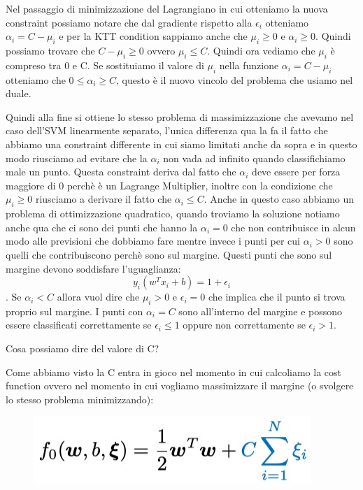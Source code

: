 \documentclass[14pt]{extreport}
\begin{document}
Nel passaggio di minimizzazione del Lagrangiano in cui otteniamo la nuova constraint possiamo notare che dal gradiente rispetto alla $\epsilon_i$
otteniamo $\alpha_i = C - \mu_i$ e per la KTT condition sappiamo anche che $\mu_i \geq 0$ e $\alpha_i \geq 0$. Quindi possiamo trovare che $C-\mu_i
\geq 0 $ ovvero $\mu_i \leq C$. Quindi ora vediamo che $\mu_i$ è compreso tra 0 e C. Se sostituiamo il valore di $\mu_i$ nella funzione $\alpha_i = C
- \mu_i$ otteniamo che $0 \leq \alpha_i \geq C$, questo è il nuovo vincolo del problema che usiamo nel duale.


Quindi alla fine si ottiene lo stesso problema di massimizzazione che avevamo nel caso dell'SVM linearmente separato, l'unica differenza qua la fa il
fatto che abbiamo una constraint differente in cui siamo limitati anche da sopra e in questo modo riusciamo ad evitare che la $\alpha_i$ non vada ad
infinito quando classifichiamo male un punto. Questa constraint deriva dal fatto che $\alpha_i$ deve essere per forza maggiore di 0 perchè è un
Lagrange Multiplier, inoltre con la condizione che $\mu_i \geq 0$ riusciamo a derivare il fatto che $\alpha_i \leq C$. Anche in questo caso abbiamo un
problema di ottimizzazione quadratico, quando troviamo la soluzione notiamo anche qua che ci sono dei punti che hanno la $\alpha_i = 0$ che non
contribuisce in alcun modo alle previsioni che dobbiamo fare mentre invece i punti per cui $\alpha_i > 0$ sono quelli che contribuiscono perchè sono
sul margine. Questi punti che sono sul margine devono soddisfare l'uguaglianza:
$$y_i(w^Tx_i+b)=1+\epsilon_i$$. Se $\alpha_i < C$ allora vuol dire che $\mu_i > 0$ e $\epsilon_i = 0$ che implica che il punto si trova proprio sul
margine. I punti con $\alpha_i=C$ sono all'interno del margine e possono essere classificati correttamente se $\epsilon_i \leq 1$ oppure non
correttamente se $\epsilon_i > 1$.

Cosa possiamo dire del valore di C?


Come abbiamo visto la C entra in gioco nel momento in cui calcoliamo la cost function ovvero nel momento in cui vogliamo massimizzare il margine (o
svolgere lo stesso problema minimizzando):

\begin{figure}[H]
	\centering
	\includegraphics[width=0.5\linewidth]{325.jpeg}
\end{figure}
\end{document}
